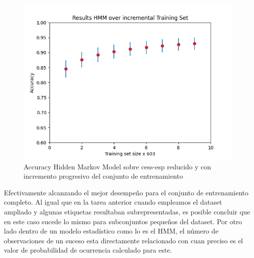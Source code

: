 \documentclass[11pt,a4paper]{report}
\begin{document}
		
		\begin{figure}[!thb]
			\begin{center}
				\includegraphics[scale=0.6]{images/incremental-set.png}
			\end{center}
			\caption{Accuracy Hidden Markov Model sobre cess-esp reducido y con incremento progresivo del conjunto de entrenamiento}
			\label{incremental-set}
		\end{figure}
		


	Efectivamente alcanzando el mejor desempeño para el conjunto de entrenamiento completo. Al igual que en la tarea anterior cuando empleamos el dataset ampliado y algunas etiquetas resultaban subrepresentadas, es posible concluir que en este caso sucede lo mismo para subconjuntos pequeños del dataset. Por otro lado dentro de un modelo estadístico como lo es el HMM, el número de observaciones de un suceso esta directamente relacionado con cuan preciso es el valor de probabilidad de ocurrencia calculado para este.\\
	
\end{document}
